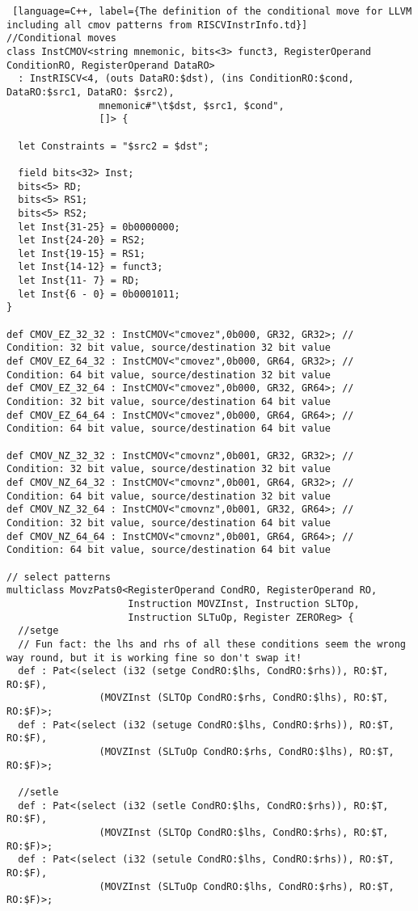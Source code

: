 \documentclass[12pt,twoside,notitlepage]{report}
\begin{document}
\begin{lstlisting} [language=C++, label={The definition of the conditional move for LLVM including all cmov patterns from RISCVInstrInfo.td}]
//Conditional moves
class InstCMOV<string mnemonic, bits<3> funct3, RegisterOperand ConditionRO, RegisterOperand DataRO>
  : InstRISCV<4, (outs DataRO:$dst), (ins ConditionRO:$cond, DataRO:$src1, DataRO: $src2), 
                mnemonic#"\t$dst, $src1, $cond",
				[]> {
   
  let Constraints = "$src2 = $dst";             

  field bits<32> Inst;
  bits<5> RD;
  bits<5> RS1;
  bits<5> RS2;
  let Inst{31-25} = 0b0000000;
  let Inst{24-20} = RS2;
  let Inst{19-15} = RS1;
  let Inst{14-12} = funct3;
  let Inst{11- 7} = RD;
  let Inst{6 - 0} = 0b0001011;
}                 

def CMOV_EZ_32_32 : InstCMOV<"cmovez",0b000, GR32, GR32>; // Condition: 32 bit value, source/destination 32 bit value
def CMOV_EZ_64_32 : InstCMOV<"cmovez",0b000, GR64, GR32>; // Condition: 64 bit value, source/destination 32 bit value
def CMOV_EZ_32_64 : InstCMOV<"cmovez",0b000, GR32, GR64>; // Condition: 32 bit value, source/destination 64 bit value
def CMOV_EZ_64_64 : InstCMOV<"cmovez",0b000, GR64, GR64>; // Condition: 64 bit value, source/destination 64 bit value

def CMOV_NZ_32_32 : InstCMOV<"cmovnz",0b001, GR32, GR32>; // Condition: 32 bit value, source/destination 32 bit value
def CMOV_NZ_64_32 : InstCMOV<"cmovnz",0b001, GR64, GR32>; // Condition: 64 bit value, source/destination 32 bit value
def CMOV_NZ_32_64 : InstCMOV<"cmovnz",0b001, GR32, GR64>; // Condition: 32 bit value, source/destination 64 bit value
def CMOV_NZ_64_64 : InstCMOV<"cmovnz",0b001, GR64, GR64>; // Condition: 64 bit value, source/destination 64 bit value

// select patterns
multiclass MovzPats0<RegisterOperand CondRO, RegisterOperand RO,
                     Instruction MOVZInst, Instruction SLTOp,
                     Instruction SLTuOp, Register ZEROReg> {
  //setge
  // Fun fact: the lhs and rhs of all these conditions seem the wrong way round, but it is working fine so don't swap it!
  def : Pat<(select (i32 (setge CondRO:$lhs, CondRO:$rhs)), RO:$T, RO:$F),
                (MOVZInst (SLTOp CondRO:$rhs, CondRO:$lhs), RO:$T, RO:$F)>;
  def : Pat<(select (i32 (setuge CondRO:$lhs, CondRO:$rhs)), RO:$T, RO:$F),
                (MOVZInst (SLTuOp CondRO:$rhs, CondRO:$lhs), RO:$T, RO:$F)>;
  
  //setle
  def : Pat<(select (i32 (setle CondRO:$lhs, CondRO:$rhs)), RO:$T, RO:$F),
                (MOVZInst (SLTOp CondRO:$lhs, CondRO:$rhs), RO:$T, RO:$F)>;
  def : Pat<(select (i32 (setule CondRO:$lhs, CondRO:$rhs)), RO:$T, RO:$F),
                (MOVZInst (SLTuOp CondRO:$lhs, CondRO:$rhs), RO:$T, RO:$F)>;				  				
 

\end{lstlisting}
\end{document}
